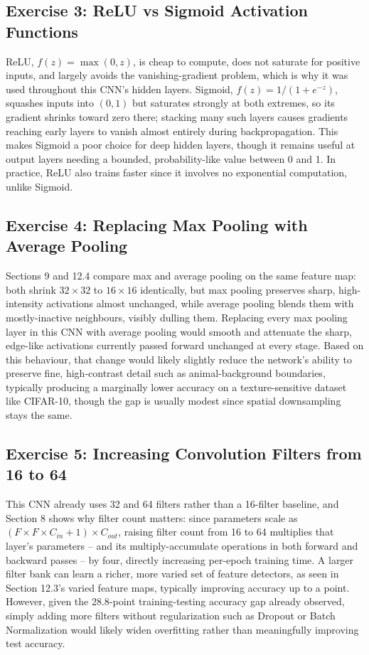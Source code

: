 \documentclass[11pt,a4paper]{article}
\begin{document}
\subsection*{Exercise 3: ReLU vs Sigmoid Activation Functions}
 
ReLU, $f(z)=\max(0,z)$, is cheap to compute, does not saturate for positive inputs, and largely avoids the vanishing-gradient problem, which is why it was used throughout this CNN's hidden layers. Sigmoid, $f(z)=1/(1+e^{-z})$, squashes inputs into $(0,1)$ but saturates strongly at both extremes, so its gradient shrinks toward zero there; stacking many such layers causes gradients reaching early layers to vanish almost entirely during backpropagation. This makes Sigmoid a poor choice for deep hidden layers, though it remains useful at output layers needing a bounded, probability-like value between 0 and 1. In practice, ReLU also trains faster since it involves no exponential computation, unlike Sigmoid.
 
\subsection*{Exercise 4: Replacing Max Pooling with Average Pooling}
 
Sections 9 and 12.4 compare max and average pooling on the same feature map: both shrink $32\times32$ to $16\times16$ identically, but max pooling preserves sharp, high-intensity activations almost unchanged, while average pooling blends them with mostly-inactive neighbours, visibly dulling them. Replacing every max pooling layer in this CNN with average pooling would smooth and attenuate the sharp, edge-like activations currently passed forward unchanged at every stage. Based on this behaviour, that change would likely slightly reduce the network's ability to preserve fine, high-contrast detail such as animal-background boundaries, typically producing a marginally lower accuracy on a texture-sensitive dataset like CIFAR-10, though the gap is usually modest since spatial downsampling stays the same.
 
\subsection*{Exercise 5: Increasing Convolution Filters from 16 to 64}
 
This CNN already uses 32 and 64 filters rather than a 16-filter baseline, and Section 8 shows why filter count matters: since parameters scale as $(F\times F\times C_{in}+1)\times C_{out}$, raising filter count from 16 to 64 multiplies that layer's parameters -- and its multiply-accumulate operations in both forward and backward passes -- by four, directly increasing per-epoch training time. A larger filter bank can learn a richer, more varied set of feature detectors, as seen in Section 12.3's varied feature maps, typically improving accuracy up to a point. However, given the 28.8-point training-testing accuracy gap already observed, simply adding more filters without regularization such as Dropout or Batch Normalization would likely widen overfitting rather than meaningfully improving test accuracy.
 
\end{document}
